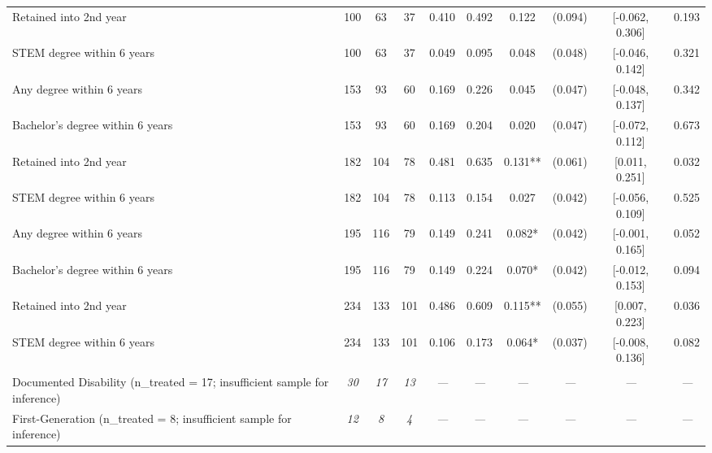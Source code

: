 \begin{table}[t]
\begin{tabular*}{\linewidth}{@{\extracolsep{\fill}}l|ccccccccc}
Retained into 2nd year & 100 & 63 & 37 & 0.410 & 0.492 & 0.122 & (0.094) & [-0.062, 0.306] & 0.193 \\ 
STEM degree within 6 years & 100 & 63 & 37 & 0.049 & 0.095 & 0.048 & (0.048) & [-0.046, 0.142] & 0.321 \\ 
Any degree within 6 years & 153 & 93 & 60 & 0.169 & 0.226 & 0.045 & (0.047) & [-0.048, 0.137] & 0.342 \\ 
Bachelor's degree within 6 years & 153 & 93 & 60 & 0.169 & 0.204 & 0.020 & (0.047) & [-0.072, 0.112] & 0.673 \\ 
Retained into 2nd year & 182 & 104 & 78 & 0.481 & 0.635 & 0.131** & (0.061) & [0.011, 0.251] & 0.032 \\ 
STEM degree within 6 years & 182 & 104 & 78 & 0.113 & 0.154 & 0.027 & (0.042) & [-0.056, 0.109] & 0.525 \\ 
Any degree within 6 years & 195 & 116 & 79 & 0.149 & 0.241 & 0.082* & (0.042) & [-0.001, 0.165] & 0.052 \\ 
Bachelor's degree within 6 years & 195 & 116 & 79 & 0.149 & 0.224 & 0.070* & (0.042) & [-0.012, 0.153] & 0.094 \\ 
Retained into 2nd year & 234 & 133 & 101 & 0.486 & 0.609 & 0.115** & (0.055) & [0.007, 0.223] & 0.036 \\ 
STEM degree within 6 years & 234 & 133 & 101 & 0.106 & 0.173 & 0.064* & (0.037) & [-0.008, 0.136] & 0.082 \\ 
\midrule\addlinespace[2.5pt]
\multicolumn{10}{l}{{\itshape \textbf{Suppressed Subgroups} \emph{(n \textless{} 20 treated --- insufficient for inference)}}} \\[2.5pt] 
\midrule\addlinespace[2.5pt]
Documented Disability (n\_treated = 17; insufficient sample for inference) & {\itshape \textcolor[HTML]{7F7F7F}{30}} & {\itshape \textcolor[HTML]{7F7F7F}{17}} & {\itshape \textcolor[HTML]{7F7F7F}{13}} & {\itshape \textcolor[HTML]{7F7F7F}{—}} & {\itshape \textcolor[HTML]{7F7F7F}{—}} & {\itshape \textcolor[HTML]{7F7F7F}{—}} & {\itshape \textcolor[HTML]{7F7F7F}{—}} & {\itshape \textcolor[HTML]{7F7F7F}{—}} & {\itshape \textcolor[HTML]{7F7F7F}{—}} \\ 
First-Generation (n\_treated = 8; insufficient sample for inference) & {\itshape \textcolor[HTML]{7F7F7F}{12}} & {\itshape \textcolor[HTML]{7F7F7F}{8}} & {\itshape \textcolor[HTML]{7F7F7F}{4}} & {\itshape \textcolor[HTML]{7F7F7F}{—}} & {\itshape \textcolor[HTML]{7F7F7F}{—}} & {\itshape \textcolor[HTML]{7F7F7F}{—}} & {\itshape \textcolor[HTML]{7F7F7F}{—}} & {\itshape \textcolor[HTML]{7F7F7F}{—}} & {\itshape \textcolor[HTML]{7F7F7F}{—}} \\ 

\end{tabular*}
\end{table}
